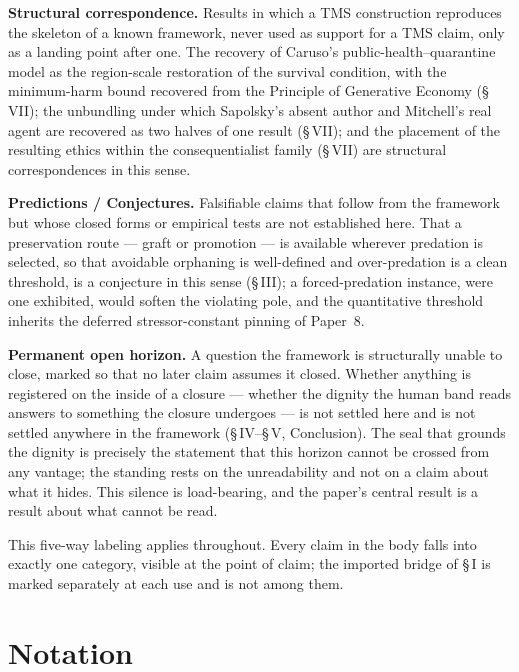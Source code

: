 \documentclass[11pt,oneside]{report}
\theoremstyle{definition}
\theoremstyle{remark}
\begin{document}
\textbf{Structural correspondence.} Results in which a TMS construction reproduces the skeleton of a known framework, never used as support for a TMS claim, only as a landing point after one. The recovery of Caruso's public-health--quarantine model as the region-scale restoration of the survival condition, with the minimum-harm bound recovered from the Principle of Generative Economy (\S\,VII); the unbundling under which Sapolsky's absent author and Mitchell's real agent are recovered as two halves of one result (\S\,VII); and the placement of the resulting ethics within the consequentialist family (\S\,VII) are structural correspondences in this sense.

\textbf{Predictions / Conjectures.} Falsifiable claims that follow from the framework but whose closed forms or empirical tests are not established here. That a preservation route --- graft or promotion --- is available wherever predation is selected, so that avoidable orphaning is well-defined and over-predation is a clean threshold, is a conjecture in this sense (\S\,III); a forced-predation instance, were one exhibited, would soften the violating pole, and the quantitative threshold inherits the deferred stressor-constant pinning of Paper~8.

\textbf{Permanent open horizon.} A question the framework is structurally unable to close, marked so that no later claim assumes it closed. Whether anything is registered on the inside of a closure --- whether the dignity the human band reads answers to something the closure undergoes --- is not settled here and is not settled anywhere in the framework (\S\,IV--\S\,V, Conclusion). The seal that grounds the dignity is precisely the statement that this horizon cannot be crossed from any vantage; the standing rests on the unreadability and not on a claim about what it hides. This silence is load-bearing, and the paper's central result is a result about what cannot be read.

This five-way labeling applies throughout. Every claim in the body falls into exactly one category, visible at the point of claim; the imported bridge of \S\,I is marked separately at each use and is not among them.

\section*{Notation}
\end{document}
